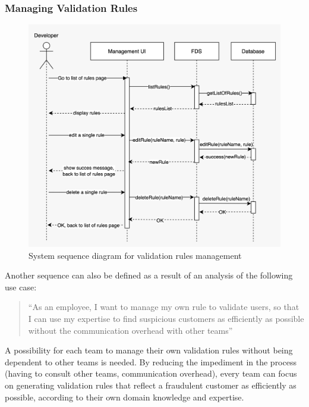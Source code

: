 \subsubsection{Managing Validation Rules}
 \label{subsection:management}

\begin{figure}[!ht]
 \includegraphics[width=\textwidth]{diagrams/sequence_management.jpeg}
 \caption{System sequence diagram for validation rules management}
\end{figure}

Another sequence can also be defined as a result of an analysis of the following use case:

\begin{quotation}
 \enquote{As an employee, I want to manage my own rule to validate users, so that I can use my expertise to find suspicious customers as efficiently as possible without the communication overhead with other teams} 
\end{quotation}

A possibility for each team to manage their own validation rules without being dependent to other teams is needed. By reducing the impediment in the process (having to consult other teams, communication overhead), every team can focus on generating validation rules that reflect a fraudulent customer as efficiently as possible, according to their own domain knowledge and expertise.

